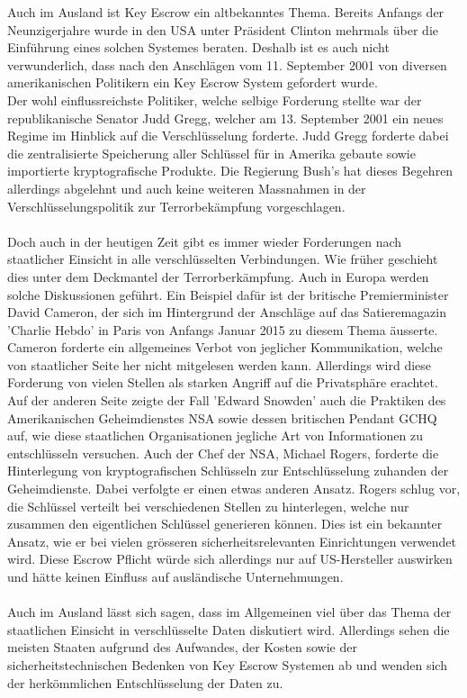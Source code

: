 Auch im Ausland ist Key Escrow ein altbekanntes Thema. Bereits Anfangs der Neunzigerjahre wurde in den USA unter Präsident Clinton mehrmals über die Einführung eines solchen Systemes beraten. \cite[S. 5735]{adminch} \cite{denning}
Deshalb ist es auch nicht verwunderlich, dass nach den Anschlägen vom 11. September 2001 von diversen amerikanischen Politikern ein Key Escrow System gefordert wurde. \\
Der wohl einflussreichste Politiker, welche selbige Forderung stellte war der republikanische Senator Judd Gregg, welcher am 13. September 2001 ein neues Regime im Hinblick auf die Verschlüsselung forderte. Judd Gregg forderte dabei die zentralisierte Speicherung aller Schlüssel für in Amerika gebaute sowie importierte kryptografische Produkte. Die Regierung Bush's hat dieses Begehren allerdings abgelehnt und auch keine weiteren Massnahmen in der Verschlüsselungspolitik zur Terrorbekämpfung vorgeschlagen. \cite{denning}\\ 
\\
Doch auch in der heutigen Zeit gibt es immer wieder Forderungen nach staatlicher Einsicht in alle verschlüsselten Verbindungen. Wie früher geschieht dies unter dem Deckmantel der Terrorberkämpfung. Auch in Europa werden solche Diskussionen geführt. Ein Beispiel dafür ist der britische Premierminister David Cameron, der sich im Hintergrund der Anschläge auf das Satieremagazin 'Charlie Hebdo' in Paris von Anfangs Januar 2015 zu diesem Thema äusserte. \\
Cameron forderte ein allgemeines Verbot von jeglicher Kommunikation, welche von staatlicher Seite her nicht mitgelesen werden kann. Allerdings wird diese Forderung von vielen Stellen als starken Angriff auf die Privatsphäre erachtet. \cite{insideit} \\
Auf der anderen Seite zeigte der Fall 'Edward Snowden' auch die Praktiken des Amerikanischen Geheimdienstes NSA sowie dessen britischen Pendant GCHQ auf, wie diese staatlichen Organisationen jegliche Art von Informationen zu entschlüsseln versuchen. Auch der Chef der NSA, Michael Rogers, forderte die Hinterlegung von kryptografischen Schlüsseln zur Entschlüsselung zuhanden der Geheimdienste. Dabei verfolgte er einen etwas anderen Ansatz. Rogers schlug vor, die Schlüssel verteilt bei verschiedenen Stellen zu hinterlegen, welche nur zusammen den eigentlichen Schlüssel generieren können. Dies ist ein bekannter Ansatz, wie er bei vielen grösseren sicherheitsrelevanten Einrichtungen verwendet wird. Diese Escrow Pflicht würde sich allerdings nur auf US-Hersteller auswirken und hätte keinen Einfluss auf ausländische Unternehmungen. \cite{annabiselli} \\
\\
Auch im Ausland lässt sich sagen, dass im Allgemeinen viel über das Thema der staatlichen Einsicht in verschlüsselte Daten diskutiert wird. Allerdings sehen die meisten Staaten aufgrund des Aufwandes, der Kosten sowie der sicherheitstechnischen Bedenken von Key Escrow Systemen ab und wenden sich der herkömmlichen Entschlüsselung der Daten zu.

